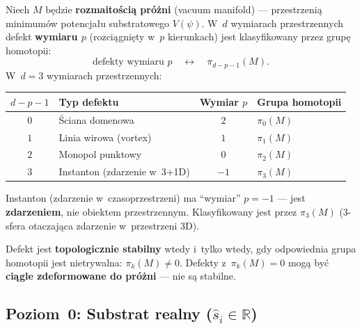 \begin{definition}\label{def:D2-defects}
Niech $M$ b\k{e}dzie \textbf{rozmaito\'sci\k{a} pr\'o\.zni}
(vacuum manifold) --- przestrzeni\k{a} minimum\'ow potencja\l{}u
substratowego $V(\psi)$. W~$d$ wymiarach przestrzennych
defekt \textbf{wymiaru $p$} (rozci\k{a}gni\k{e}ty w~$p$ kierunkach)
jest klasyfikowany przez grup\k{e} homotopii:
\begin{equation}\label{eq:D2-defect-class}
  \text{defekty wymiaru } p
  \quad\longleftrightarrow\quad
  \pi_{d-p-1}(M).
\end{equation}
W~$d = 3$ wymiarach przestrzennych:
\begin{center}\small
\begin{tabular}{clcl}
\toprule
\textbf{$d{-}p{-}1$} & \textbf{Typ defektu} & \textbf{Wymiar $p$}
  & \textbf{Grupa homotopii} \\
\midrule
$0$ & \'Sciana domenowa & $2$ & $\pi_0(M)$ \\
$1$ & Linia wirowa (vortex) & $1$ & $\pi_1(M)$ \\
$2$ & Monopol punktowy & $0$ & $\pi_2(M)$ \\
$3$ & Instanton (zdarzenie w~3+1D) & $-1$ & $\pi_3(M)$ \\
\bottomrule
\end{tabular}
\end{center}
\noindent
Instanton (zdarzenie w~czasoprzestrzeni) ma ``wymiar'' $p = -1$ ---
jest \textbf{zdarzeniem}, nie obiektem przestrzennym.
Klasyfikowany jest przez $\pi_3(M)$ (3-sfera otaczaj\k{a}ca
zdarzenie w~przestrzeni 3D).
\end{definition}

\begin{remark}\label{rem:D2-stability}
Defekt jest \textbf{topologicznie stabilny} wtedy i~tylko wtedy,
gdy odpowiednia grupa homotopii jest nietrywalna:
$\pi_k(M) \neq 0$. Defekty z~$\pi_k(M) = 0$ mog\k{a}
by\'c \textbf{ci\k{a}gle zdeformowane do pr\'o\.zni} ---
nie s\k{a} stabilne.
\end{remark}

\subsection{Poziom~0: Substrat realny ($\hat{s}_i \in \mathbb{R}$)}%
\label{ssec:D2-level0}

